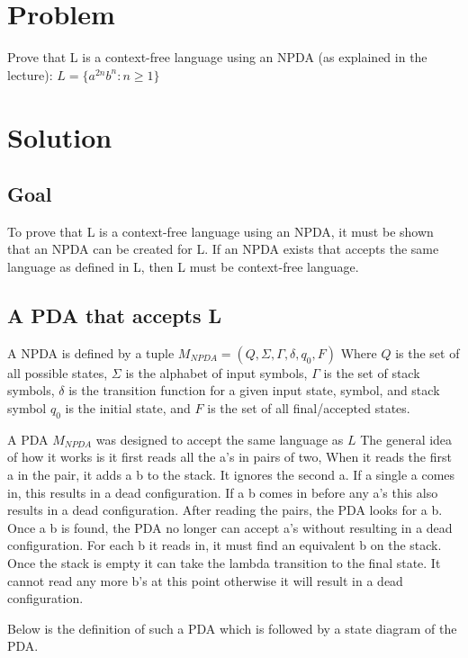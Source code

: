 \documentclass{assignment-x}
\begin{document}
\maketitle
\pagebreak

\section{Problem}
Prove that L is a context-free language using an NPDA (as explained in the lecture): 
$L=\{a^{2n}b^n: n \ge 1 \}$

\section{Solution}
\subsection{Goal}
To prove that L is a context-free language using an NPDA, it must be shown that an NPDA can be created for L.
If an NPDA exists that accepts the same language as defined in L, then L must be context-free language.

\subsection{A PDA that accepts L}
A NPDA is defined by a tuple $M_{NPDA} = (Q,\Sigma,\Gamma,\delta,q_0,F)$
Where $Q$ is the set of all possible states, $\Sigma$ is the alphabet of input symbols, $\Gamma$ is the set of stack symbols, $\delta$ is the transition function for a given input state, symbol, and stack symbol $q_0$ is the initial state, and $F$ is the set of all final/accepted states.

A PDA $M_{NPDA}$ was designed to accept the same language as $L$
The general idea of how it works is it first reads all the a's in pairs of two,
When it reads the first a in the pair, it adds a b to the stack.
It ignores the second a.
If a single a comes in, this results in a dead configuration.
If a b comes in before any a's this also results in a dead configuration.
After reading the pairs, the PDA looks for a b.
Once a b is found, the PDA no longer can accept a's without resulting in a dead configuration.
For each b it reads in, it must find an equivalent b on the stack.
Once the stack is empty it can take the lambda transition to the final state.
It cannot read any more b's at this point otherwise it will result in a dead configuration.

Below is the definition of such a PDA which is followed by a state diagram of the PDA.
\end{document}
